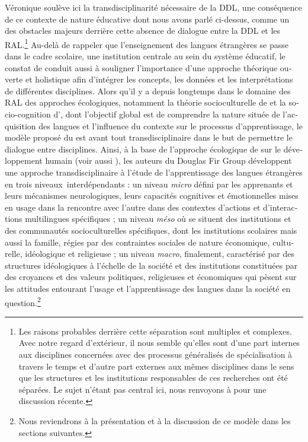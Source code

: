 \documentclass[french, output=paper]{langscibook}
\begin{document}
\begin{otherlanguage}{french}
\begin{sloppypar}
Véronique soulève ici la transdisciplinarité nécessaire de la DDL, une conséquence de ce contexte de nature éducative dont nous avons parlé ci-dessus, comme un des obstacles majeurs derrière cette absence de dialogue entre la DDL et les RAL.\footnote{Les raisons probables derrière cette séparation sont multiples et complexes. Avec notre regard d’extérieur, il nous semble qu’elles sont d’une part internes aux disciplines concernées avec des processus généralisés de spécialisation à travers le temps et d’autre part externes aux mêmes disciplines dans le sens que les structures et les institutions responsables de ces recherches ont été séparées. Le sujet n’étant pas central ici, nous renvoyons à \citet{Hilton2021} pour une discussion récente.} Au-delà de rappeler que l’enseignement des langues étrangères se passe dans le cadre scolaire, une institution centrale au sein du système éducatif, le constat de \citet{Véronique2009} conduit aussi à souligner l’importance d’une approche théorique ouverte et holistique afin d’intégrer les concepts, les données et les interprétations de différentes disciplines. Alors qu’il y a depuis longtemps dans le domaine des RAL des approches écologiques, notamment la théorie socioculturelle de \citet{vanLier2004} et la socio-cognition d’\citet{Atkinson2011}, dont l’objectif global est de comprendre la nature située de l’acquisition des langues et l’influence du contexte sur le processus d’apprentissage, le modèle proposé du \citet{TheDouglasFirGroup2016} est avant tout transdisciplinaire dans le but de permettre le dialogue entre disciplines. Ainsi, à la base de l’approche écologique de \citet{Bronfenbrenner1979} sur le développement humain (voir aussi \citealt{Pallotti2002}), les auteurs du Douglas Fir Group développent une approche transdisciplinaire à l’étude de l’apprentissage des langues étrangères en trois niveaux~interdépendants : un niveau \textit{micro} défini par les apprenants et leurs mécanismes neurologiques, leurs capacités cognitives et émotionnelles mises en usage dans la rencontre avec l'autre dans des contextes d'actions et d'interactions multilingues spécifiques ; un niveau \textit{méso} où se situent des institutions et des communautés socioculturelles spécifiques, dont les institutions scolaires mais aussi la famille, régies par des contraintes sociales de nature économique, culturelle, idéologique et religieuse ; un niveau \textit{macro}, finalement, caractérisé par des structures idéologiques à l'échelle de la société et des institutions constituées par des croyances et des valeurs politiques, religieuses et économiques qui pèsent sur les attitudes entourant l'usage et l’apprentissage des langues dans la société en question.\footnote{Nous reviendrons à la présentation et à la discussion de ce modèle dans les sections suivantes.}
\end{sloppypar}


\end{otherlanguage}
\end{document}
